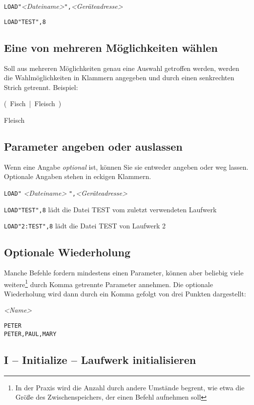 \documentclass[10pt,a4paper]{scrartcl}		%
\begin{document}
\texttt{LOAD"}\textit{<Dateiname>}\texttt{",}\textit{<Geräteadresse>}

\texttt{LOAD"TEST",8}

\subsection*{Eine von mehreren Möglichkeiten wählen}
Soll aus mehreren Möglichkeiten genau eine Auswahl getroffen werden,
werden die Wahlmöglichkeiten in Klammern angegeben und durch einen
senkrechten Strich getrennt. Beispiel:

\mbox{\Big( Fisch \Big| \normalsize Fleisch \Big) \normalsize} 

Fleisch

\subsection*{Parameter angeben oder auslassen}
Wenn eine Angabe \textit{optional} ist, können Sie sie entweder
angeben oder weg lassen. Optionale Angaben stehen in eckigen Klammern.

\texttt{LOAD"}  \textit{<Dateiname>}
\texttt{",}\textit{<Geräteadresse>}

\texttt{LOAD"TEST",8} lädt die Datei TEST vom zuletzt 
verwendeten Laufwerk

\texttt{LOAD"2:TEST",8} lädt die Datei TEST von Laufwerk 2

\subsection*{Optionale Wiederholung}
Manche Befehle fordern mindestens einen Parameter, können aber beliebig
viele weitere\footnote{
	In der Praxis wird die Anzahl durch andere Umstände begrent, 
	wie etwa die Größe des Zwischenspeichers, der einen Befehl
	aufnehmen soll
} durch Komma getrennte Parameter annehmen. Die optionale Wiederholung
wird dann durch ein Komma gefolgt von drei Punkten dargestellt:

\mbox{\textit{<Name>} \Big[ \texttt{,} \ldots \ \Big]}

\begin{verbatim}
PETER
PETER,PAUL,MARY
\end{verbatim}

\subsection{I -- Initialize -- Laufwerk initialisieren}
\end{document}
